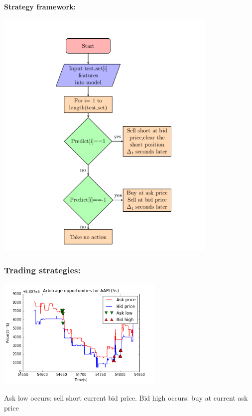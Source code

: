 \documentclass[xcolor={x11names,svgnames,dvipsnames}]{beamer}
\begin{document}
\begin{frame}
\textbf{Strategy framework:}
\begin{center}
     \includegraphics[width=0.8\textwidth, height=0.9\textheight]{strategy_algorithm.png}
\end{center}    
\end{frame}

\begin{frame}
\frametitle{Trading strategies:}


\begin{center}
     \includegraphics[width=0.6\textwidth, height=0.6\textheight]{arbitrage_plot.png}
\end{center}    
Ask low occurs: sell short current bid price. Bid high occurs: buy at current ask price
\end{frame}
\end{document}
